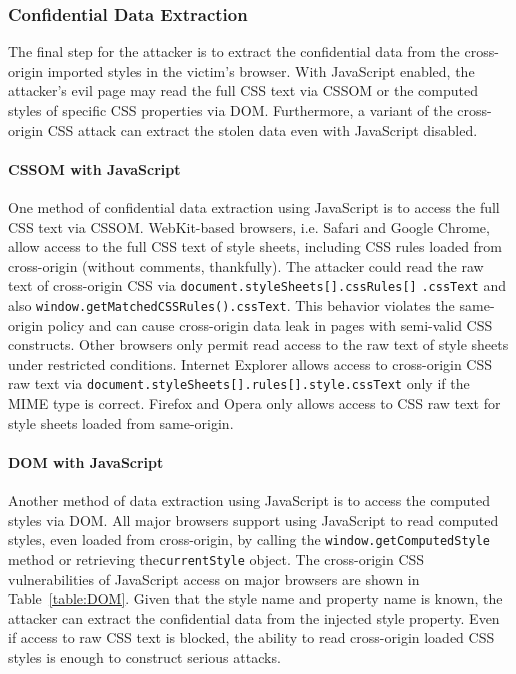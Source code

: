 \documentclass{acm_proc_article-sp}
\begin{document}
\subsubsection{Confidential Data Extraction}\label{sec:extraction}
The final step for the attacker is to extract the confidential data from the cross-origin imported styles in the victim's browser. With JavaScript enabled, the attacker's evil page may read the full CSS text via CSSOM or the computed styles of specific CSS properties via DOM. Furthermore, a variant of the cross-origin CSS attack can extract the stolen data even with JavaScript disabled. 

\paragraph{CSSOM with JavaScript}
One method of confidential data extraction using JavaScript is to access the full CSS text via CSSOM. WebKit-based browsers, i.e. Safari and Google Chrome, allow access to the full CSS text of style sheets, including CSS rules loaded from cross-origin (without comments, thankfully). The attacker could read the raw text of cross-origin CSS via \texttt{document.styleSheets[].cssRules[]} \texttt{.cssText} and also \texttt{window.getMatchedCSSRules().cssText}. This behavior violates the same-origin policy and can cause cross-origin data leak in pages with semi-valid CSS constructs. Other browsers only permit read access to the raw text of style sheets under restricted conditions. Internet Explorer allows access to cross-origin CSS raw text via \texttt{document.styleSheets[].rules[].style.cssText} only if the MIME type is correct. Firefox and Opera only allows access to CSS raw text for style sheets loaded from same-origin.

\paragraph{DOM with JavaScript}
Another method of data extraction using JavaScript is to access the computed styles via DOM. All major browsers support using JavaScript to read computed styles, even loaded from cross-origin, by calling the \texttt{window.getComputedStyle} method or retrieving the\linebreak \texttt{currentStyle} object. The cross-origin CSS vulnerabilities of JavaScript access on major browsers are shown in Table~\ref{table:DOM}. Given that the style name and property name is known, the attacker can extract the confidential data from the injected style property. Even if access to raw CSS text is blocked, the ability to read cross-origin loaded CSS styles is enough to construct serious attacks.
\end{document}
